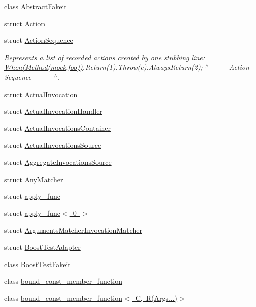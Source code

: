 \begin{DoxyCompactItemize}
\item 
class \mbox{\hyperlink{classfakeit_1_1AbstractFakeit}{Abstract\+Fakeit}}
\item 
struct \mbox{\hyperlink{structfakeit_1_1Action}{Action}}
\item 
struct \mbox{\hyperlink{structfakeit_1_1ActionSequence}{Action\+Sequence}}
\begin{DoxyCompactList}\small\item\em Represents a list of recorded actions created by one stubbing line\+: \mbox{\hyperlink{single__header_2tpunit_2fakeit_8hpp_a665d1615d3ae3f21983056f052ab7f24}{When(\+Method(mock,foo))}}.Return(1).Throw(e).Always\+Return(2); $^\wedge$-\/-\/-\/-\/-\/---Action-\/\+Sequence-\/-\/-\/-\/-\/-\/---$^\wedge$. \end{DoxyCompactList}\item 
struct \mbox{\hyperlink{structfakeit_1_1ActualInvocation}{Actual\+Invocation}}
\item 
struct \mbox{\hyperlink{structfakeit_1_1ActualInvocationHandler}{Actual\+Invocation\+Handler}}
\item 
struct \mbox{\hyperlink{structfakeit_1_1ActualInvocationsContainer}{Actual\+Invocations\+Container}}
\item 
struct \mbox{\hyperlink{structfakeit_1_1ActualInvocationsSource}{Actual\+Invocations\+Source}}
\item 
struct \mbox{\hyperlink{structfakeit_1_1AggregateInvocationsSource}{Aggregate\+Invocations\+Source}}
\item 
struct \mbox{\hyperlink{structfakeit_1_1AnyMatcher}{Any\+Matcher}}
\item 
struct \mbox{\hyperlink{structfakeit_1_1apply__func}{apply\+\_\+func}}
\item 
struct \mbox{\hyperlink{structfakeit_1_1apply__func_3_010_01_4}{apply\+\_\+func$<$ 0 $>$}}
\item 
struct \mbox{\hyperlink{structfakeit_1_1ArgumentsMatcherInvocationMatcher}{Arguments\+Matcher\+Invocation\+Matcher}}
\item 
struct \mbox{\hyperlink{structfakeit_1_1BoostTestAdapter}{Boost\+Test\+Adapter}}
\item 
class \mbox{\hyperlink{classfakeit_1_1BoostTestFakeit}{Boost\+Test\+Fakeit}}
\item 
class \mbox{\hyperlink{classfakeit_1_1bound__const__member__function}{bound\+\_\+const\+\_\+member\+\_\+function}}
\item 
class \mbox{\hyperlink{classfakeit_1_1bound__const__member__function_3_01C_00_01R_07Args_8_8_8_08_4}{bound\+\_\+const\+\_\+member\+\_\+function$<$ C, R(\+Args...)$>$}}

\end{DoxyCompactItemize}
